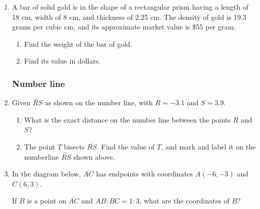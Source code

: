 \begin{enumerate}
\item A bar of solid gold is in the shape of a rectangular prism having a length of 18 cm, width of 8 cm, and thickness of 2.25 cm. The density of gold is 19.3 grams per cubic cm, and its approximate market value is \$55 per gram.
\begin{enumerate}
  \item Find the weight of the bar of gold.  %
  \item Find its value in dollars.
\end{enumerate}



\newpage
\subsubsection*{Number line}
\item Given $\overleftrightarrow{RS}$ as shown on the number line, with $R=-3.1$ and $S=3.9$. \\[20pt] %
  \begin{enumerate}
    \item What is the exact distance on the number line between the points $R$ and $S$? \vspace{2cm} 
    \item The point $T$ bisects $\overline{RS}$. Find the value of $T$, and mark and label it on the numberline $\overleftrightarrow{RS}$ shown above. 
  \end{enumerate} %

\item In the diagram below, $\overline{AC}$ has endpoints with coordinates $A(-6,-3)$ and $C(6, 3)$.
\begin{center} %
\end{center}
If $B$ is a point on $\overline{AC}$ and $AB {:} BC = 1{:}3$,  what  are  the coordinates of $B$? %


\end{enumerate}
